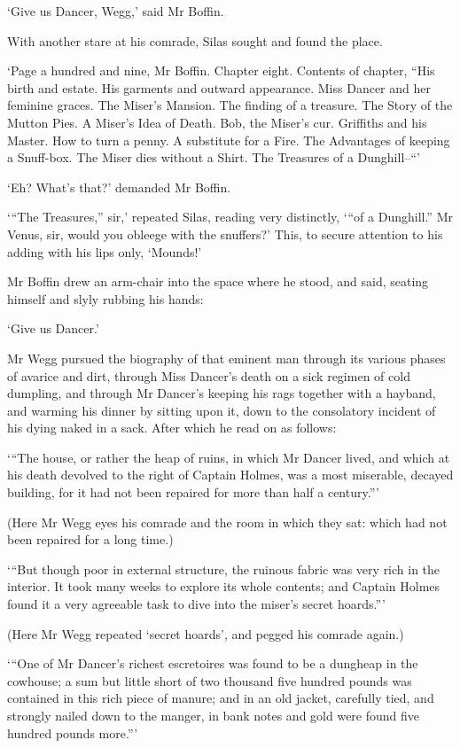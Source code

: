‘Give us Dancer, Wegg,’ said Mr Boffin.

With another stare at his comrade, Silas sought and found the place.

‘Page a hundred and nine, Mr Boffin. Chapter eight. Contents of chapter,
“His birth and estate. His garments and outward appearance. Miss Dancer
and her feminine graces. The Miser’s Mansion. The finding of a treasure.
The Story of the Mutton Pies. A Miser’s Idea of Death. Bob, the Miser’s
cur. Griffiths and his Master. How to turn a penny. A substitute for a
Fire. The Advantages of keeping a Snuff-box. The Miser dies without a
Shirt. The Treasures of a Dunghill--“’

‘Eh? What’s that?’ demanded Mr Boffin.

‘“The Treasures,” sir,’ repeated Silas, reading very distinctly, ‘“of a
Dunghill.” Mr Venus, sir, would you obleege with the snuffers?’ This, to
secure attention to his adding with his lips only, ‘Mounds!’

Mr Boffin drew an arm-chair into the space where he stood, and said,
seating himself and slyly rubbing his hands:

‘Give us Dancer.’

Mr Wegg pursued the biography of that eminent man through its various
phases of avarice and dirt, through Miss Dancer’s death on a sick
regimen of cold dumpling, and through Mr Dancer’s keeping his rags
together with a hayband, and warming his dinner by sitting upon it, down
to the consolatory incident of his dying naked in a sack. After which he
read on as follows:

‘“The house, or rather the heap of ruins, in which Mr Dancer lived, and
which at his death devolved to the right of Captain Holmes, was a most
miserable, decayed building, for it had not been repaired for more than
half a century.”’

(Here Mr Wegg eyes his comrade and the room in which they sat: which had
not been repaired for a long time.)

‘“But though poor in external structure, the ruinous fabric was very
rich in the interior. It took many weeks to explore its whole contents;
and Captain Holmes found it a very agreeable task to dive into the
miser’s secret hoards.”’

(Here Mr Wegg repeated ‘secret hoards’, and pegged his comrade again.)

‘“One of Mr Dancer’s richest escretoires was found to be a dungheap in
the cowhouse; a sum but little short of two thousand five hundred
pounds was contained in this rich piece of manure; and in an old jacket,
carefully tied, and strongly nailed down to the manger, in bank notes
and gold were found five hundred pounds more.”’

